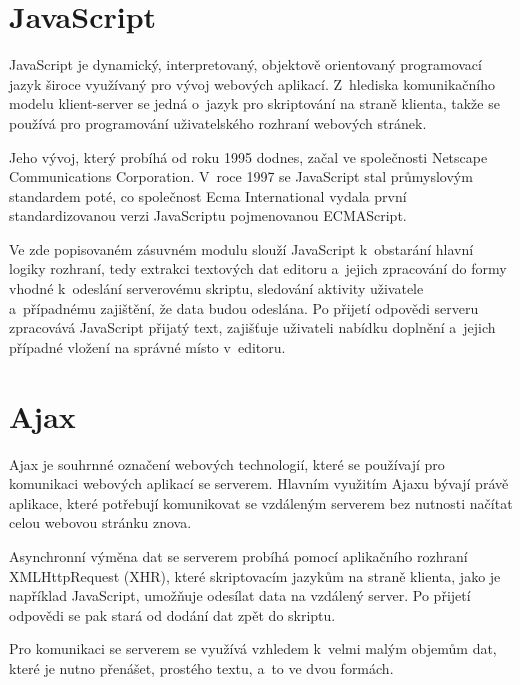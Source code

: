 \documentclass[a4paper,11pt,openany]{book} %
\begin{document}
\section{JavaScript}

JavaScript je dynamický, interpretovaný, objektově orientovaný programovací jazyk široce využívaný pro vývoj webových aplikací. Z~hlediska komunikačního modelu klient-server se jedná o~jazyk pro skriptování na straně klienta, takže se používá pro programování uživatelského rozhraní webových stránek. \parencite[2--4]{flanagan2006javascript} %


Jeho vývoj, který probíhá od roku 1995 dodnes, začal ve společnosti Netscape Communications Corporation. V~roce 1997 se JavaScript stal průmyslovým standardem poté, co společnost Ecma International vydala první standardizovanou verzi JavaScriptu pojmenovanou ECMAScript. \parencite{brendaneich2011} %

Ve zde popisovaném zásuvném modulu slouží JavaScript k~obstarání hlavní logiky rozhraní, tedy extrakci textových dat editoru a~jejich zpracování do formy vhodné k~odeslání serverovému skriptu, sledování aktivity uživatele a~případnému zajištění, že data budou odeslána. Po přijetí odpovědi serveru zpracovává JavaScript přijatý text, zajišťuje uživateli nabídku doplnění a~jejich případné vložení na správné místo v~editoru. 

\section{Ajax}

Ajax je souhrnné označení webových technologií, které se používají pro komunikaci webových aplikací se serverem. Hlavním využitím Ajaxu bývají právě aplikace, které potřebují komunikovat se vzdáleným serverem bez nutnosti načítat celou webovou stránku znova. \parencite{garrett2005ajax}

Asynchronní výměna dat se serverem probíhá pomocí aplikačního rozhraní XMLHttpRequest (XHR), které skriptovacím jazykům na straně klienta, jako je například JavaScript, umožňuje odesílat data na vzdálený server. Po přijetí odpovědi se pak stará od dodání dat zpět do skriptu.

Pro komunikaci se serverem se využívá vzhledem k~velmi malým objemům dat, které je nutno přenášet, prostého textu, a~to ve dvou formách. 
\end{document}
